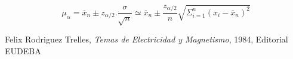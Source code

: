 \documentclass[11pt,a4paper]{article}
\begin{document}
\begin{equation}\label{inter_final}
\ \mu_{\alpha} = \overline{x}_n \pm z_{\alpha/2}.\frac{\sigma}{\sqrt{n}} \simeq \overline{x}_n \pm \frac{z_{\alpha/2}}{n} \sqrt{\Sigma_{i=1}^{n}(x_i-\overline{x}_n)^2}
\end{equation}



\begin{thebibliography}{1}
  Felix Rodriguez Trelles, \textit{Temas de Electricidad y Magnetismo}, 1984, Editorial EUDEBA
\end{thebibliography}
 
\end{document}
